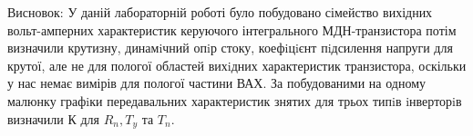 \documentclass[a4paper,14pt]{extreport}
\begin{document}




Висновок: У даній лабораторній роботі було побудовано сімейство вихідних вольт-амперних характеристик керуючого інтегрального МДН-транзистора потім визначили крутизну, динамiчний опiр стоку, коефiцiєнт пiдсилення напруги для крутої, але не для пологої областей вихiдних характеристик транзистора, оскільки у нас немає вимірів для пологої частини ВАХ. За побудованими на одному малюнку графiки передавальних характеристик знятих для трьох типiв iнверторiв визначили К для $R_{n}, T_{y} $ та  $ T_{n}$.
\end{document}
